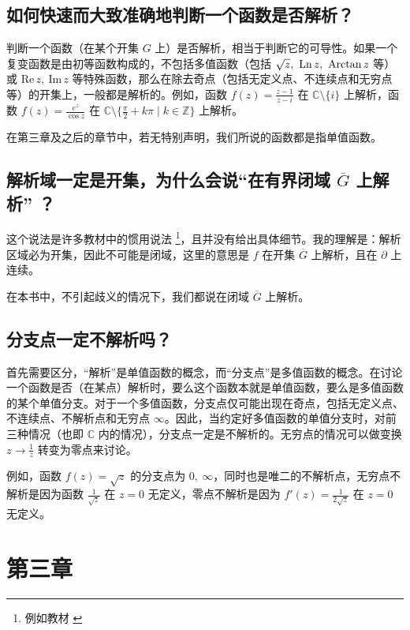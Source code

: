\documentclass[UTF8]{report}
\def\Im{\mathrm{Im\,}}
\def\Re{\mathrm{Re\,}}
\def\Ln{\mathrm{Ln\,}}
\def\Z{\mathbb{Z}}
\def\C{\mathbb{C}}
\theoremstyle{MyLineTheoremStyle} %
\theoremstyle{MyBlockTheoremStyle} %
\theoremstyle{MySubsubsectionStyle} %
\begin{document}
\subsection{如何快速而大致准确地判断一个函数是否解析？}

判断一个函数（在某个开集 $G$ 上）是否解析，相当于判断它的可导性。如果一个复变函数是由初等函数构成的，不包括多值函数（包括 $\sqrt{z},\ \Ln z,\ \text{Arctan\,} z$ 等）或 $\Re z,\ \Im z$ 等特殊函数，那么在除去奇点（包括无定义点、不连续点和无穷点等）的开集上，一般都是解析的。例如，函数 $f(z) = \frac{z - 1}{z - i}$ 在 $\C \setminus \{i\}$ 上解析，函数 $f(z) = \frac{e^z}{\cos z}$ 在 $\C \setminus \{\frac{\pi}{2} + k\pi \mid k \in \Z \}$ 上解析。

在第三章及之后的章节中，若无特别声明，我们所说的函数都是指单值函数。

\subsection{解析域一定是开集，为什么会说“在有界闭域 $\overline{G} $ 上解析” ？}\label{在闭域上解析}

这个说法是许多教材中的惯用说法 \footnote{例如教材 \cite{数学物理方法}}，且并没有给出具体细节。我的理解是：解析区域必为开集，因此不可能是闭域，这里的意思是 $f$ 在开集 $\overline{G}$ 上解析，且在 $\partial$ 上连续。

在本书中，不引起歧义的情况下，我们都说在闭域 $\overline{G} $ 上解析。

\subsection{分支点一定不解析吗？}
首先需要区分，“解析”是单值函数的概念，而“分支点”是多值函数的概念。在讨论一个函数是否（在某点）解析时，要么这个函数本就是单值函数，要么是多值函数的某个单值分支。对于一个多值函数，分支点仅可能出现在奇点，包括无定义点、不连续点、不解析点和无穷点 $\infty$。因此，当约定好多值函数的单值分支时，对前三种情况（也即 $\C$ 内的情况），分支点一定是不解析的。无穷点的情况可以做变换 $z \to \frac{1}{z}$ 转变为零点来讨论。

例如，函数 $f(z) = \sqrt{z}$ 的分支点为 ${0,\ \infty}$，同时也是唯二的不解析点，无穷点不解析是因为函数 $\frac{1}{\sqrt{z}}$ 在 $z = 0$ 无定义，零点不解析是因为 $f'(z) = \frac{1}{2\sqrt{z}}$ 在 $z = 0$ 无定义。

\section{第三章}
\end{document}
